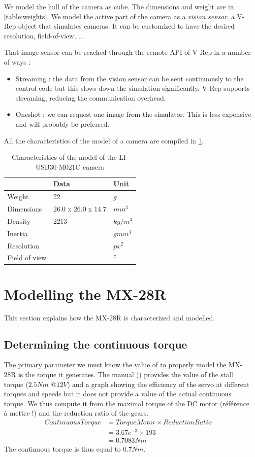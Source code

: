 We model the hull of the camera as cube. The dimensions and weight are in \cref{table:weights}. We model the active part of the camera as a \emph{vision sensor}, a V-Rep object that simulates cameras. It can be customized to have the desired resolution, field-of-view, ...

That image sensor can be reached through the remote API of V-Rep in a number of ways : \begin{itemize}
\item Streaming : the data from the vision sensor can be sent continuously to the control code but this slows down the simulation significantly. V-Rep supports streaming, reducing the communication overhead.
\item Oneshot : we can request one image from the simulator. This is less expensive and will probably be preferred.
\end{itemize} 

All the characteristics of the model of a camera are compiled in \cref{table:cam_specs}.

\begin{table}[htp]
\center
\begin{tabularx}{\textwidth}{@{}X X X @{}}
\toprule
 & \textbf{Data} & \textbf{Unit}\\ 
\midrule
Weight & 22 & $g$\\
Dimensions & 26.0 x 26.0 x 14.7 & $mm^3$\\
Density & 2213 & $kg/m^3$\\
Inertia & & $gmm^3$\\
Resolution &  & $px^2$\\
Field of view & & $\degree$\\
\bottomrule
\end{tabularx}
\caption[Characteristics of the LI-USB30-M021C camera]{Characteristics of the model of the LI-USB30-M021C camera}
\label{table:cam_specs}
\end{table}

\section{Modelling the MX-28R}
This section explains how the MX-28R is characterized and modelled.

\subsection{Determining the continuous torque}
The primary parameter we must know the value of to properly model the MX-28R is the torque it generates. The manual (\cite{mx_28_manual}) provides the value of the stall torque ($2.5Nm$ @$12V$) and a graph showing the efficiency of the servo at different torques and speeds but it does not provide a value of the actual continuous torque. We thus compute it from the maximal torque of the DC motor (référence à mettre !) and the reduction ratio of the gears. 
\begin{align*}
ContinuousTorque &= TorqueMotor \times ReductionRatio\\
&= 3.67e^{-3} \times 193\\
&= 0.7083Nm
\end{align*}
The continuous torque is thus equal to $0.7Nm$.

